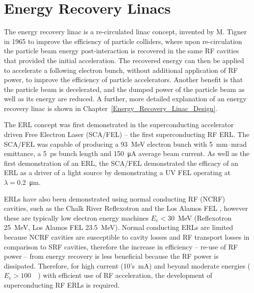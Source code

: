 \documentclass[../main.tex]{subfiles}
\begin{document}
\section{Energy Recovery Linacs}

The energy recovery linac is a re-circulated linac concept, invented by M. Tigner in 1965 \cite{tigner1965possible} to improve the efficiency of particle colliders, where upon re-circulation the particle beam energy post-interaction is recovered in the same RF cavities that provided the initial acceleration. The recovered energy can then be applied to accelerate a following electron bunch, without additional application of RF power, to improve the efficiency of particle accelerators. Another benefit is that the particle beam is decelerated, and the dumped power of the particle beam as well as its energy are reduced. A further, more detailed explanation of an energy recovery linac is shown in Chapter~\ref{Energy_Recovery_Linac_Design}.

The ERL concept was first demonstrated in the superconducting accelerator driven Free Electron Laser (SCA/FEL) \cite{smith1987development} -- the first superconducting RF ERL. The SCA/FEL was capable of producing a 93~\si{\mega\electronvolt} electron bunch with 5~\si{\milli\meter}--\si{\milli\radian} emittance, a 5~\si{\pico\second} bunch length and 150~\si{\micro\ampere} average beam current. As well as the first demonstration of an ERL, the SCA/FEL demonstrated the efficacy of an ERL as a driver of a light source by demonstrating a UV FEL operating at $\lambda = 0.2$~\si{\micro\meter}.

ERLs have also been demonstrated using normal conducting RF (NCRF) cavities, such as the Chalk River Reflexotron \cite{schriber1977experimental} and the Los Alamos FEL \cite{feldman1987energy}, however these are typically low electron energy machines $E_{e} < 30$~\si{\mega\electronvolt} (Reflexotron 25~\si{\mega\electronvolt}, Los Alamos FEL 23.5~\si{\mega\electronvolt}). Normal conducting ERLs are limited because NCRF cavities are susceptible to cavity losses and RF transport losses \cite{adolphsen2022european} in comparison to SRF cavities, therefore the increase in efficiency -- re-use of RF power -- from energy recovery is less beneficial because the RF power is dissipated. Therefore, for high current (10's~\si{\milli\ampere}) and beyond moderate energies ($E_{e} > 100$~\si{\mega\electron}) with efficient use of RF acceleration, the development of superconducting RF ERLs is required.
\end{document}
